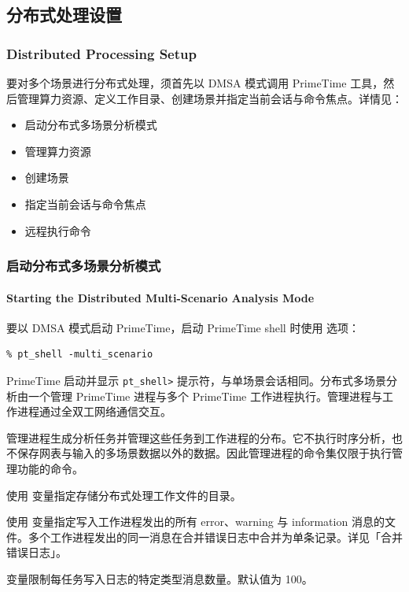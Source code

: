 \subsection{分布式处理设置}
\subsubsection*{Distributed Processing Setup}

要对多个场景进行分布式处理，须首先以 DMSA 模式调用 PrimeTime 工具，然后管理算力资源、定义工作目录、创建场景并指定当前会话与命令焦点。详情见：
\begin{itemize}
  \item 启动分布式多场景分析模式
  \item 管理算力资源
  \item 创建场景
  \item 指定当前会话与命令焦点
  \item 远程执行命令
\end{itemize}

\subsubsection{启动分布式多场景分析模式}
\paragraph*{Starting the Distributed Multi-Scenario Analysis Mode}

要以 DMSA 模式启动 PrimeTime，启动 PrimeTime shell 时使用  选项：
\begin{lstlisting}
% pt_shell -multi_scenario
\end{lstlisting}

PrimeTime 启动并显示 \texttt{pt\_shell>} 提示符，与单场景会话相同。分布式多场景分析由一个管理 PrimeTime 进程与多个 PrimeTime 工作进程执行。管理进程与工作进程通过全双工网络通信交互。

管理进程生成分析任务并管理这些任务到工作进程的分布。它不执行时序分析，也不保存网表与输入的多场景数据以外的数据。因此管理进程的命令集仅限于执行管理功能的命令。

使用  变量指定存储分布式处理工作文件的目录。

使用  变量指定写入工作进程发出的所有 error、warning 与 information 消息的文件。多个工作进程发出的同一消息在合并错误日志中合并为单条记录。详见「合并错误日志」。

 变量限制每任务写入日志的特定类型消息数量。默认值为 100。

